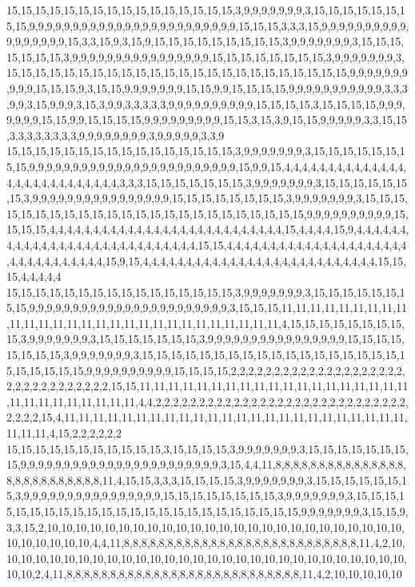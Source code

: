 15,15,15,15,15,15,15,15,15,15,15,15,15,15,15,15,3,9,9,9,9,9,9,9,3,15,15,15,15,15,15,15,15,9,9,9,9,9,9,9,9,9,9,9,9,9,9,9,9,9,9,9,9,9,9,9,9,15,15,15,3,3,3,15,9,9,9,9,9,9,9,9,9,9,9,9,9,9,9,9,9,15,3,3,15,9,3,15,9,15,15,15,15,15,15,15,15,15,3,9,9,9,9,9,9,9,3,15,15,15,15,15,15,15,3,9,9,9,9,9,9,9,9,9,9,9,9,9,9,9,9,15,15,15,15,15,15,15,15,3,9,9,9,9,9,9,9,3,15,15,15,15,15,15,15,15,15,15,15,15,15,15,15,15,15,15,15,15,15,15,15,15,9,9,9,9,9,9,9,9,9,9,15,15,15,9,3,15,15,9,9,9,9,9,9,9,15,15,9,9,15,15,15,15,9,9,9,9,9,9,9,9,9,9,9,3,3,3,9,9,3,15,9,9,9,3,15,3,9,9,3,3,3,3,3,9,9,9,9,9,9,9,9,9,9,15,15,15,15,3,15,15,15,15,9,9,9,9,9,9,9,15,15,9,9,15,15,15,15,9,9,9,9,9,9,9,9,9,15,15,3,15,3,9,15,15,9,9,9,9,9,3,3,15,15,3,3,3,3,3,3,3,3,9,9,9,9,9,9,9,9,3,9,9,9,9,9,3,3,9
15,15,15,15,15,15,15,15,15,15,15,15,15,15,15,15,3,9,9,9,9,9,9,9,3,15,15,15,15,15,15,15,15,9,9,9,9,9,9,9,9,9,9,9,9,9,9,9,9,9,9,9,9,9,9,9,9,15,9,9,15,4,4,4,4,4,4,4,4,4,4,4,4,4,4,4,4,4,4,4,4,4,4,4,4,4,4,4,3,3,3,15,15,15,15,15,15,15,3,9,9,9,9,9,9,9,3,15,15,15,15,15,15,15,3,9,9,9,9,9,9,9,9,9,9,9,9,9,9,9,9,15,15,15,15,15,15,15,15,3,9,9,9,9,9,9,9,3,15,15,15,15,15,15,15,15,15,15,15,15,15,15,15,15,15,15,15,15,15,15,15,15,9,9,9,9,9,9,9,9,9,9,15,15,15,15,4,4,4,4,4,4,4,4,4,4,4,4,4,4,4,4,4,4,4,4,4,4,4,4,4,4,4,15,4,4,4,4,15,9,4,4,4,4,4,4,4,4,4,4,4,4,4,4,4,4,4,4,4,4,4,4,4,4,4,4,4,4,15,15,4,4,4,4,4,4,4,4,4,4,4,4,4,4,4,4,4,4,4,4,4,4,4,4,4,4,4,4,4,4,4,4,15,9,15,4,4,4,4,4,4,4,4,4,4,4,4,4,4,4,4,4,4,4,4,4,4,4,4,4,4,4,15,15,15,4,4,4,4,4
15,15,15,15,15,15,15,15,15,15,15,15,15,15,15,15,3,9,9,9,9,9,9,9,3,15,15,15,15,15,15,15,15,9,9,9,9,9,9,9,9,9,9,9,9,9,9,9,9,9,9,9,9,9,9,9,3,15,15,15,11,11,11,11,11,11,11,11,11,11,11,11,11,11,11,11,11,11,11,11,11,11,11,11,11,11,11,11,4,15,15,15,15,15,15,15,15,15,3,9,9,9,9,9,9,9,3,15,15,15,15,15,15,15,3,9,9,9,9,9,9,9,9,9,9,9,9,9,9,9,9,15,15,15,15,15,15,15,15,3,9,9,9,9,9,9,9,3,15,15,15,15,15,15,15,15,15,15,15,15,15,15,15,15,15,15,15,15,15,15,15,15,9,9,9,9,9,9,9,9,9,9,15,15,15,15,2,2,2,2,2,2,2,2,2,2,2,2,2,2,2,2,2,2,2,2,2,2,2,2,2,2,2,2,2,2,2,2,15,15,11,11,11,11,11,11,11,11,11,11,11,11,11,11,11,11,11,11,11,11,11,11,11,11,11,11,11,11,4,4,2,2,2,2,2,2,2,2,2,2,2,2,2,2,2,2,2,2,2,2,2,2,2,2,2,2,2,2,2,2,2,2,2,15,4,11,11,11,11,11,11,11,11,11,11,11,11,11,11,11,11,11,11,11,11,11,11,11,11,11,11,11,4,15,2,2,2,2,2,2
15,15,15,15,15,15,15,15,15,15,15,3,15,15,15,15,3,9,9,9,9,9,9,9,3,15,15,15,15,15,15,15,15,9,9,9,9,9,9,9,9,9,9,9,9,9,9,9,9,9,9,9,9,9,9,9,3,15,4,4,11,8,8,8,8,8,8,8,8,8,8,8,8,8,8,8,8,8,8,8,8,8,8,8,8,8,8,11,4,15,15,3,3,3,15,15,15,15,3,9,9,9,9,9,9,9,3,15,15,15,15,15,15,15,3,9,9,9,9,9,9,9,9,9,9,9,9,9,9,9,9,15,15,15,15,15,15,15,15,3,9,9,9,9,9,9,9,3,15,15,15,15,15,15,15,15,15,15,15,15,15,15,15,15,15,15,15,15,15,15,15,15,9,9,9,9,9,9,9,3,15,15,9,3,3,15,2,10,10,10,10,10,10,10,10,10,10,10,10,10,10,10,10,10,10,10,10,10,10,10,10,10,10,10,10,10,10,10,4,4,11,8,8,8,8,8,8,8,8,8,8,8,8,8,8,8,8,8,8,8,8,8,8,8,8,8,8,8,11,4,2,10,10,10,10,10,10,10,10,10,10,10,10,10,10,10,10,10,10,10,10,10,10,10,10,10,10,10,10,10,10,10,2,4,11,8,8,8,8,8,8,8,8,8,8,8,8,8,8,8,8,8,8,8,8,8,8,8,8,8,8,8,11,4,2,10,10,10,10,10
